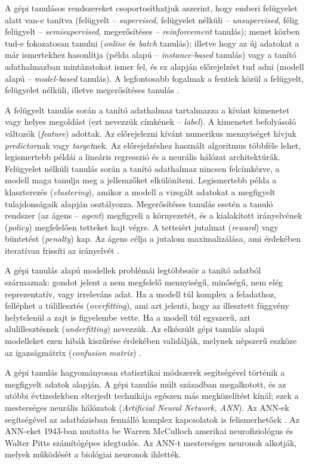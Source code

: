 \documentclass[12pt,a4paper]{article}
\begin{document}
A gépi tanulásos rendszereket csoportosíthatjuk aszerint, hogy emberi felügyelet alatt van-e tanítva (felügyelt -- \textit{supervised}, felügyelet nélküli -- \textit{unsupervised}, félig felügyelt -- \textit{semisupervised}, megerősítéses -- \textit{reinforcement} tanulás); menet közben tud-e fokozatosan tanulni (\textit{online} és \textit{batch} tanulás); illetve hogy az új adatokat a már ismertekhez hasonlítja (példa alapú -- \textit{instance-based} tanulás) vagy a tanító adathalmazban mintázatokat ismer fel, és ez alapján előrejelzést tud adni (modell alapú -- \textit{model-based} tanulás). A legfontosabb fogalmak a fentiek közül a felügyelt, felügyelet nélküli, illetve megerősítéses tanulás \cite{geron_hands-machine_2017}. 

A felügyelt tanulás során a tanító adathalmaz tartalmazza a kívánt kimenetet vagy helyes megoldást (ezt nevezzük címkének -- \textit{label}). A kimenetet befolyásoló változók (\textit{feature}) adottak. Az előrejelezni kívánt numerikus mennyiséget hívjuk \textit{predictor}nak vagy \textit{target}nek. Az előrejelzéshez használt algoritmus többféle lehet, legismertebb példái a lineáris regresszió és a neurális hálózat architektúrák. Felügyelet nélküli tanulás során a tanító adathalmaz nincsen felcímkézve, a modell maga tanulja meg a jellemzőket elkülöníteni. Legismertebb példa a klaszterezés (\textit{clustering}), amikor a modell a vizsgált adatokat a megfigyelt tulajdonságaik alapján osztályozza. Megerősítéses tanulás esetén a tanuló rendszer (az ágens -- \textit{agent}) megfigyeli a környezetét, és a kialakított irányelvének (\textit{policy}) megfelelően tetteket hajt végre. A tetteiért jutalmat (\textit{reward}) vagy büntetést (\textit{penalty}) kap. Az ágens célja a jutalom maximalizálása, ami érdekében iteratívan frissíti az irányelvét \cite{geron_hands-machine_2017}. 

A gépi tanulás alapú modellek problémái legtöbbször a tanító adatból származnak: gondot jelent a nem megfelelő mennyiségű, minőségű, nem elég reprezentatív, vagy irreleváns adat. Ha a modell túl komplex a feladathoz, felléphet a túlillesztés (\textit{overfitting}), ami azt jelenti, hogy az illesztett függvény helytelenül a zajt is figyelembe vette. Ha a modell túl egyszerű, azt alulillesztésnek (\textit{underfitting}) nevezzük. Az elkészült gépi tanulás alapú modelleket ezen hibák kiszűrése érdekében validálják, melynek népszerű eszköze az igazságmátrix (\textit{confusion matrix}) \cite{geron_hands-machine_2017}.

A gépi tanulás hagyományosan statisztikai módszerek segítségével történik a megfigyelt adatok alapján. A gépi tanulás múlt században megalkotott, és az utóbbi évtizedekben elterjedt technikája egészen más megközelítést kínál; ezek a mesterséges neurális hálózatok (\textit{Artificial Neural Network, ANN}). Az ANN-ek segítségével az adatbázisban fennálló komplex kapcsolatok is felismerhetőek \cite{sharifani_machine_2023}. Az ANN-eket 1943-ban mutatta be Warren McCulloch amerikai neurofiziológus és Walter Pitts számítógépes idegtudós. Az ANN-t mesterséges neuronok alkotják, melyek működését a biológiai neuronok ihlették.
\end{document}
